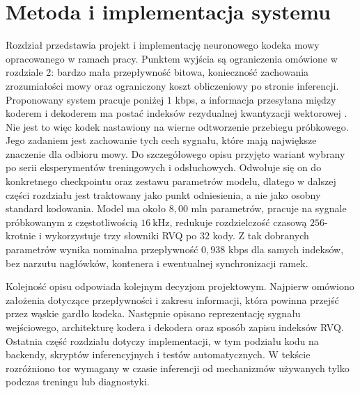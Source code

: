 \chapter{Metoda i implementacja systemu}
\label{ch:metoda-implementacja}

\providecommand{\notatabeli}[1]{%
\par\smallskip
\begin{minipage}{0.90\textwidth}
\footnotesize\raggedright\emph{#1}
\end{minipage}\par
}

Rozdział przedstawia projekt i implementację neuronowego kodeka mowy opracowanego w ramach pracy. Punktem wyjścia są ograniczenia omówione w rozdziale 2: bardzo mała przepływność bitowa, konieczność zachowania zrozumiałości mowy oraz ograniczony koszt obliczeniowy po stronie inferencji. Proponowany system pracuje poniżej \(1\) kbps, a informacja przesyłana między koderem i dekoderem ma postać indeksów rezydualnej kwantyzacji wektorowej \cite{Gray1984VectorQuantization,Zeghidour2021SoundStream,Defossez2022Encodec}. Nie jest to więc kodek nastawiony na wierne odtworzenie przebiegu próbkowego. Jego zadaniem jest zachowanie tych cech sygnału, które mają największe znaczenie dla odbioru mowy. Do szczegółowego opisu przyjęto wariant wybrany po serii eksperymentów treningowych i odsłuchowych. Odwołuje się on do konkretnego checkpointu oraz zestawu parametrów modelu, dlatego w dalszej części rozdziału jest traktowany jako punkt odniesienia, a nie jako osobny standard kodowania. Model ma około \(8{,}00\) mln parametrów, pracuje na sygnale próbkowanym z częstotliwością \(16\ \mathrm{kHz}\), redukuje rozdzielczość czasową \(256\)-krotnie i wykorzystuje trzy słowniki RVQ po \(32\) kody. Z tak dobranych parametrów wynika nominalna przepływność \(0{,}938\) kbps dla samych indeksów, bez narzutu nagłówków, kontenera i ewentualnej synchronizacji ramek.

Kolejność opisu odpowiada kolejnym decyzjom projektowym. Najpierw omówiono założenia dotyczące przepływności i zakresu informacji, która powinna przejść przez wąskie gardło kodeka. Następnie opisano reprezentację sygnału wejściowego, architekturę kodera i dekodera oraz sposób zapisu indeksów RVQ. Ostatnia część rozdziału dotyczy implementacji, w tym podziału kodu na backendy, skryptów inferencyjnych i testów automatycznych. W tekście rozróżniono tor wymagany w czasie inferencji od mechanizmów używanych tylko podczas treningu lub diagnostyki.

